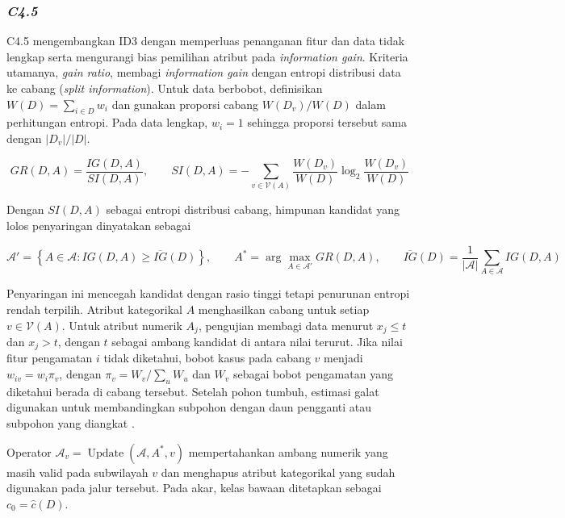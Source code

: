 \subsubsection{\textit{C4.5}}

C4.5 mengembangkan ID3 dengan memperluas penanganan fitur dan data tidak lengkap serta mengurangi bias pemilihan atribut pada \textit{information gain}. Kriteria utamanya, \textit{gain ratio}, membagi \textit{information gain} dengan entropi distribusi data ke cabang (\textit{split information}). Untuk data berbobot, definisikan $W(D)=\sum_{i\in D}w_i$ dan gunakan proporsi cabang $W(D_v)/W(D)$ dalam perhitungan entropi. Pada data lengkap, $w_i=1$ sehingga proporsi tersebut sama dengan $|D_v|/|D|$.

\begin{equation}
    GR(D,A)=\frac{IG(D,A)}{SI(D,A)},\qquad
    SI(D,A)=-\sum_{v\in\mathcal{V}(A)}\frac{W(D_v)}{W(D)}\log_2\frac{W(D_v)}{W(D)}
    \label{eq:c45-gain-ratio}
\end{equation}

Dengan $SI(D,A)$ sebagai entropi distribusi cabang, himpunan kandidat yang lolos penyaringan dinyatakan sebagai

\begin{equation}
    \mathcal{A}'=\left\{A\in\mathcal{A}:IG(D,A)\geq\overline{IG}(D)\right\},
    \qquad
    A^*=\arg\max_{A\in\mathcal{A}'}GR(D,A),
    \qquad
    \overline{IG}(D)=\frac{1}{|\mathcal{A}|}\sum_{A\in\mathcal{A}}IG(D,A)
    \label{eq:c45-selection}
\end{equation}

Penyaringan ini mencegah kandidat dengan rasio tinggi tetapi penurunan entropi rendah terpilih. Atribut kategorikal $A$ menghasilkan cabang untuk setiap $v\in\mathcal{V}(A)$. Untuk atribut numerik $A_j$, pengujian membagi data menurut $x_j\leq t$ dan $x_j>t$, dengan $t$ sebagai ambang kandidat di antara nilai terurut. Jika nilai fitur pengamatan $i$ tidak diketahui, bobot kasus pada cabang $v$ menjadi $w_{iv}=w_i\pi_v$, dengan $\pi_v=W_v/\sum_u W_u$ dan $W_v$ sebagai bobot pengamatan yang diketahui berada di cabang tersebut. Setelah pohon tumbuh, estimasi galat digunakan untuk membandingkan subpohon dengan daun pengganti atau subpohon yang diangkat \cite{quinlan1993c45}.

Operator $\mathcal{A}_v=\operatorname{Update}(\mathcal{A},A^*,v)$ mempertahankan ambang numerik yang masih valid pada subwilayah $v$ dan menghapus atribut kategorikal yang sudah digunakan pada jalur tersebut. Pada akar, kelas bawaan ditetapkan sebagai $c_0=\hat{c}(D)$.


